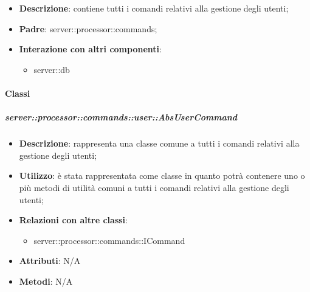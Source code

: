      \begin{itemize}
        \item \textbf{Descrizione}: contiene tutti i comandi relativi alla gestione degli utenti;
        \item \textbf{Padre}: server::processor::commands;
        \item \textbf{Interazione con altri componenti}:
          \begin{itemize}
            \item server::db
          \end{itemize}
      \end{itemize}

        \paragraph{Classi} %

        \subparagraph{server::processor::commands::user::AbsUserCommand} %
        \label{subp:bdsm_app_server_processor_commands_user_absusercommand}
        \begin{itemize}
          \item \textbf{Descrizione}: rappresenta una classe comune a tutti i comandi relativi alla gestione degli utenti;
          \item \textbf{Utilizzo}: è stata rappresentata come classe in quanto potrà contenere uno o più metodi di utilità comuni a tutti i comandi relativi alla gestione degli utenti;
          \item \textbf{Relazioni con altre classi}:
            \begin{itemize}
              \item server::processor::commands::ICommand
            \end{itemize}
      \item \textbf{Attributi}: N/A
      \item \textbf{Metodi}: N/A
        \end{itemize}

